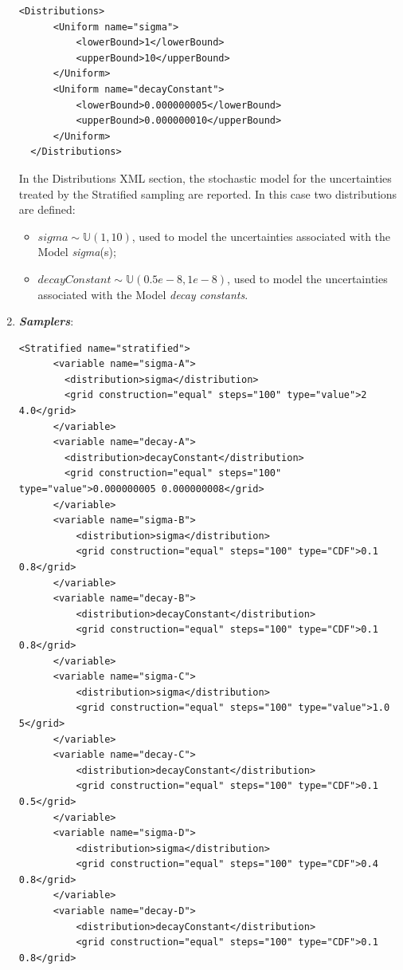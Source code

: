 \begin{enumerate}
\begin{lstlisting}[style=XML,morekeywords={arg,extension,pauseAtEnd,overwrite}]
  <Distributions>
      <Uniform name="sigma">
          <lowerBound>1</lowerBound>
          <upperBound>10</upperBound>
      </Uniform>
      <Uniform name="decayConstant">
          <lowerBound>0.000000005</lowerBound>
          <upperBound>0.000000010</upperBound>
      </Uniform>
  </Distributions>   
\end{lstlisting}
  In the Distributions XML section, the stochastic model for the 
  uncertainties  treated by the Stratified sampling are reported. In 
  this case two distributions are defined: 
  \begin{itemize}
    \item $sigma \sim \mathbb{U}(1,10)$, used to model the uncertainties 
    associated with  the Model \textit{sigma}(s);
    \item  $decayConstant \sim \mathbb{U}(0.5e-8,1e-8)$,  used to 
    model the uncertainties 
    associated with  the Model \textit{decay constants}.
  \end{itemize}
   \item \textbf{\textit{Samplers}}:
\begin{lstlisting}[style=XML,morekeywords={arg,extension,pauseAtEnd,overwrite}]
    <Stratified name="stratified">
      <variable name="sigma-A">
        <distribution>sigma</distribution>
        <grid construction="equal" steps="100" type="value">2 4.0</grid>
      </variable>
      <variable name="decay-A">
        <distribution>decayConstant</distribution>
        <grid construction="equal" steps="100" type="value">0.000000005 0.000000008</grid>
      </variable>
      <variable name="sigma-B">
          <distribution>sigma</distribution>
          <grid construction="equal" steps="100" type="CDF">0.1 0.8</grid>
      </variable>
      <variable name="decay-B">
          <distribution>decayConstant</distribution>
          <grid construction="equal" steps="100" type="CDF">0.1 0.8</grid>
      </variable>
      <variable name="sigma-C">
          <distribution>sigma</distribution>
          <grid construction="equal" steps="100" type="value">1.0 5</grid>
      </variable>
      <variable name="decay-C">
          <distribution>decayConstant</distribution>
          <grid construction="equal" steps="100" type="CDF">0.1 0.5</grid>
      </variable>
      <variable name="sigma-D">
          <distribution>sigma</distribution>
          <grid construction="equal" steps="100" type="CDF">0.4 0.8</grid>
      </variable>
      <variable name="decay-D">
          <distribution>decayConstant</distribution>
          <grid construction="equal" steps="100" type="CDF">0.1 0.8</grid>

\end{lstlisting}
\end{enumerate}
